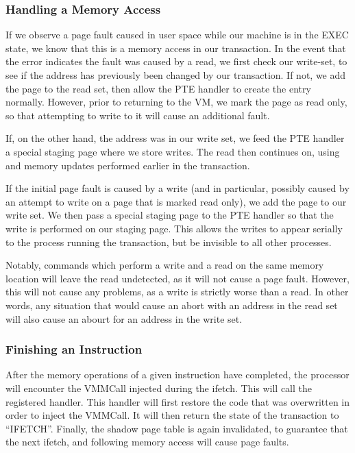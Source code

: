 \documentclass{acm_proc_article-sp}
\begin{document}
\subsubsection{Handling a Memory Access}

If we observe a page fault caused in user space while our machine is in the
EXEC state, we know that this is a memory access in our transaction. In the 
event that the error indicates the fault was caused by a read, we first check
our write-set, to see if the address has previously been changed by our 
transaction. If not, we add the page to the read set, then allow the PTE
handler to create the entry normally. However, prior to returning to the VM,
we mark the page as read only, so that attempting to write to it will cause
an additional fault.

If, on the other hand, the address was in our write set, we feed the PTE
handler a special staging page where we store writes. The read then continues
on, using and memory updates performed earlier in the transaction.

If the initial page fault is caused by a write (and in particular, possibly 
caused by an attempt to write on a page that is marked read only), we 
add the page to our write set. We then pass a special staging page to the PTE
handler so that the write is performed on our staging page. This allows the 
writes to appear serially to the process running the transaction, but be
invisible to all other processes.

Notably, commands which perform a write and a read on the same memory location
will leave the read undetected, as it will not cause a page fault. However,
this will not cause any problems, as a write is strictly worse than a read. In
other words, any situation that would cause an abort with an address in the 
read set will also cause an abourt for an address in the write set.

\subsubsection{Finishing an Instruction}

After the memory operations of a given instruction have completed, the 
processor will encounter the VMMCall injected during the ifetch. This will
call the registered handler. This handler will first restore the code that
was overwritten in order to inject the VMMCall. It will then return the state
of the transaction to ``IFETCH''. Finally, the shadow page table is again 
invalidated, to guarantee that the next ifetch, and following memory access 
will cause page faults.  
\end{document}
